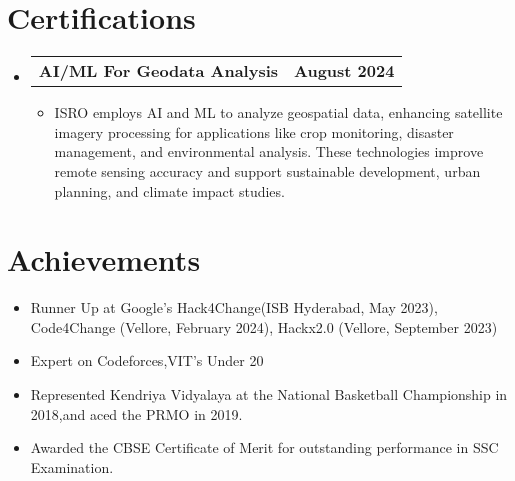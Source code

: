 \documentclass[a4paper,11pt]{article}
\makeatletter
\newcommand{\resumeItem}[1]{
  \item\small{
    {#1 \vspace{-2pt}}
  }
}
\newcommand{\resumeSubheadingg}[2]{
  \vspace{-2pt}\item
    \begin{tabular*}{1.0\textwidth}[t]{l@{\extracolsep{\fill}}r}
      \textbf{#1} & \textbf{\small #2} \\
    \end{tabular*}\vspace{-7pt}
}
\newcommand{\resumeSubHeadingListStart}{\begin{itemize}[leftmargin=0.0in, label={}]}
\newcommand{\resumeSubHeadingListEnd}{\end{itemize}}
\newcommand{\resumeItemListStart}{\begin{itemize}}
\newcommand{\resumeItemListEnd}{\end{itemize}\vspace{-5pt}}
\makeatother
\begin{document}
\section{Certifications}
  \resumeSubHeadingListStart
    \resumeSubheadingg
      {AI/ML For Geodata Analysis}{August 2024}
      \resumeItemListStart
        \resumeItem{ISRO employs AI and ML to analyze geospatial data, enhancing satellite imagery processing for applications like crop monitoring, disaster management, and environmental analysis. These technologies improve remote sensing accuracy and support sustainable development, urban planning, and climate impact studies.}
    \resumeItemListEnd
  \resumeSubHeadingListEnd

\section{Achievements}
     \resumeItemListStart
        \resumeItem{Runner Up at Google's Hack4Change(ISB Hyderabad, May 2023), Code4Change (Vellore, February 2024), Hackx2.0 (Vellore, September 2023)}
        \vspace{-6pt}

        \resumeItem{Expert on Codeforces,VIT's Under 20}
        \vspace{-6pt}
          

\resumeItem{Represented Kendriya Vidyalaya at the National Basketball Championship in 2018,and aced the PRMO in 2019.}
        \vspace{-6pt}
        \resumeItem{Awarded the CBSE Certificate of Merit for outstanding performance in SSC Examination.}
   \resumeItemListEnd
\end{document}
